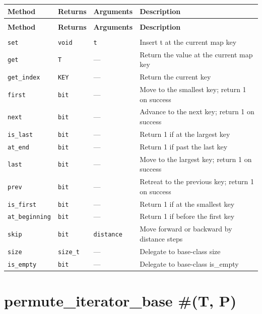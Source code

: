 \documentclass[11pt,letterpaper]{report}
\begin{document}
\begin{xltabular}{\linewidth}{>{\small}p{1.35in} >{\small}p{1.25in} >{\small}p{0.95in} >{\small}X}
\toprule
\textbf{Method} & \textbf{Returns} & \textbf{Arguments} & \textbf{Description} \\
\midrule
\endfirsthead
{} \\
\midrule
\textbf{Method} & \textbf{Returns} & \textbf{Arguments} & \textbf{Description} \\
\midrule
\endhead
\midrule
{} \\
\endfoot
\bottomrule
\endlastfoot
\texttt{set} & \texttt{void} & \texttt{t} & Insert t at the current map key \\
\texttt{get} & \texttt{T} & --- & Return the value at the current map key \\
\texttt{get\_index} & \texttt{KEY} & --- & Return the current key \\
\texttt{first} & \texttt{bit} & --- & Move to the smallest key; return 1 on success \\
\texttt{next} & \texttt{bit} & --- & Advance to the next key; return 1 on success \\
\texttt{is\_last} & \texttt{bit} & --- & Return 1 if at the largest key \\
\texttt{at\_end} & \texttt{bit} & --- & Return 1 if past the last key \\
\texttt{last} & \texttt{bit} & --- & Move to the largest key; return 1 on success \\
\texttt{prev} & \texttt{bit} & --- & Retreat to the previous key; return 1 on success \\
\texttt{is\_first} & \texttt{bit} & --- & Return 1 if at the smallest key \\
\texttt{at\_beginning} & \texttt{bit} & --- & Return 1 if before the first key \\
\texttt{skip} & \texttt{bit} & \texttt{distance} & Move forward or backward by distance steps \\
\texttt{size} & \texttt{size\_t} & --- & Delegate to base-class size \\
\texttt{is\_empty} & \texttt{bit} & --- & Delegate to base-class is\_empty \\
\end{xltabular}

\section{permute\_iterator\_base \#(T, P)}
\label{cls:permuteiteratorbaseTP}
\end{document}
